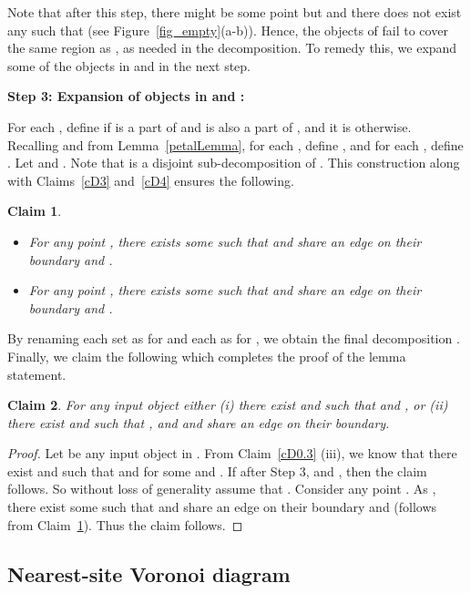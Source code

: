\documentclass[a4paper,11pt]{article}
\newtheorem{claim}{Claim}
\begin{document}
Note that after this step, there might be some point  but  and there does not exist any  such that    (see Figure~\ref{fig_empty}(a-b)). 
Hence, the objects of  fail to cover the same region as , as needed in the decomposition. 
To remedy this, we expand some of the objects in  and  in the next step.

{\bf Step 3: Expansion of objects in  and  :}

For each , define  if  is a part of  and  is also a part of , and it is  otherwise.  
Recalling  and  from Lemma~\ref{petalLemma}, for each , define , and for each ,  define  . 
Let   and  . Note that  is a disjoint 
sub-decomposition of  .
This construction 
along with Claims~\ref{cD3} and~\ref{cD4}  ensures the following.

\begin{claim}\label{cD9}
  \begin{itemize}
   \item For any point , 
   there exists some  such that   and  share an edge on their boundary and .

\item For any point , there exists  some  such that   and   share an edge on their boundary and .
\end{itemize}
\end{claim}

 
By renaming each set  as  for  and each  as  for , we obtain the final decomposition . Finally, we claim the following which completes the proof of the lemma statement.

\begin{claim}\label{cD10}
 For any input  object   
either (i) there exist   and 
 such that   and  , or (ii) there exist 
  and 
 such that  , and 
 and   share an edge on their boundary.
\end{claim}


\begin{proof}
  Let  be any input object in . From Claim~\ref{cD0.3} (iii), we know that  there exist 
 and  such 
that   and   for some  
and . If after Step 3,  and  , then the claim 
follows. So without loss of generality assume that . Consider any point . As , there exist some  
such that  and 
 share an edge on their boundary and  
(follows from Claim~\ref{cD9}). Thus the claim follows.
\end{proof}   


\subsection{Nearest-site Voronoi diagram} \label{nvd}
\end{document}
